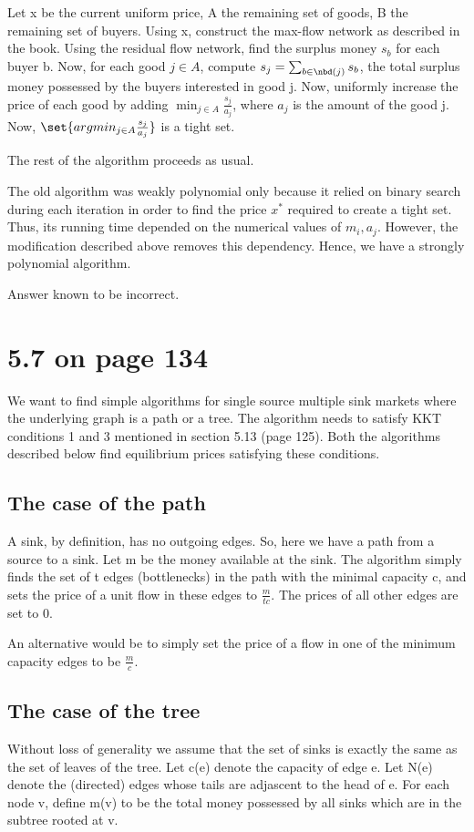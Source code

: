\documentclass[10pt]{amsart}
\begin{document}
Let x be the current uniform price, A the remaining set of goods, B the remaining set of buyers. Using x, construct the max-flow network as described in the book. Using the residual flow network, find the surplus money $s_{b}$ for each buyer b. Now, for each good $j \in A$, compute $s_{j} = \sum_{b \in \nbd(j)}s_{b}$, the total surplus money possessed by the buyers interested in good j. Now, uniformly increase the price of each good by adding $\min_{j \in A} \frac{s_{j}}{a_{j}}$, where $a_{j}$ is the amount of the good j. Now, $\set{argmin_{j \in A} \frac{s_{j}}{a_{j}}}$ is a tight set.

The rest of the algorithm proceeds as usual.

The old algorithm was weakly polynomial only because it relied on binary search during each iteration in order to find the price $x^{*}$ required to create a tight set. Thus, its running time depended on the numerical values of $m_{i}, a_{j}$. However, the modification described above removes this dependency. Hence, we have a strongly polynomial algorithm.

\begin{rem}
 Answer known to be incorrect.
\end{rem}


\section{5.7 on page 134}
We want to find simple algorithms for single source multiple sink markets where the underlying graph is a path or a tree. The algorithm needs to satisfy KKT conditions 1 and 3 mentioned in section 5.13 (page 125). Both the algorithms described below find equilibrium prices satisfying these conditions.

\subsection{The case of the path}
A sink, by definition, has no outgoing edges. So, here we have a path from a source to a sink. Let m be the money available at the sink. The algorithm simply finds the set of t edges (bottlenecks) in the path with the minimal capacity c, and sets the price of a unit flow in these edges to $\frac{m}{tc}$. The prices of all other edges are set to 0.

An alternative would be to simply set the price of a flow in one of the minimum capacity edges to be $\frac{m}{c}$.

\subsection{The case of the tree}
Without loss of generality we assume that the set of sinks is exactly the same as the set of leaves of the tree. Let c(e) denote the capacity of edge e. Let N(e) denote the (directed) edges whose tails are adjascent to the head of e. For each node v, define m(v) to be the total money possessed by all sinks which are in the subtree rooted at v.
\end{document}
